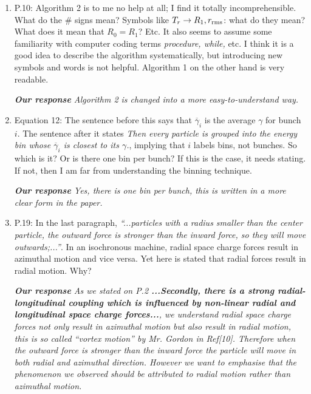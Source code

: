 \documentclass[10pt]{report}
\begin{document}
\begin{enumerate}
\item P.10: Algorithm 2 is to me no help at all; I find it totally
 incomprehensible. 
 What do the \# signs mean? Symbols like $T_r\rightarrow R_1,r_{\rm rms}$: what
 do they mean? What does it mean that $R_0=R_1$? Etc. It also seems to assume
 some familiarity with computer coding terms \textit{procedure, while,} etc. I
 think it is a good idea to describe the algorithm systematically, but
 introducing new symbols and words is not helpful. Algorithm 1 on the other hand
 is very readable.
 
 \vspace{+2mm}
 {\it {\bf Our response} Algorithm 2 is changed into a more easy-to-understand way.
 }
 \vspace{+2mm}

  \item Equation 12: The sentence before this says that $\overline{\gamma}_i$ is
 the 
 average $\gamma$ for bunch $i$. The sentence after it states \textit{Then every
 particle is grouped into the energy bin whose $\overline{\gamma}_i$ is closest
 to its $\gamma$.}, implying that $i$ labels bins, not bunches. So which is it?
 Or is there one bin per bunch? If this is the case, it needs stating. If not,
 then I am far from understanding the binning technique.

 
 \vspace{+2mm}
 {\it {\bf Our response}  Yes, there is one bin per bunch, this is written in a more clear form 
 in the paper. }
 \vspace{+2mm}

 \item P.19: In the last paragraph, \textit{``...particles with a radius smaller
 than the center particle, the outward force is stronger than the inward force,
 so they will move outwards;...''}. In an isochronous machine, radial space
 charge forces result in azimuthal motion and vice versa. Yet here is stated
 that radial forces result in radial motion. Why?
 
 \vspace{+2mm}
 {\it {\bf Our response} As we stated on P.2 {\bf ...Secondly, there is a strong radial-longitudinal coupling which is influenced by non-linear radial and
longitudinal space charge forces...}, we understand radial space charge forces not only result in azimuthal motion but also result in radial motion, 
this is so called  ``vortex motion'' by Mr. Gordon in Ref[10]. Therefore when the outward force is stronger than the inward force the particle will move 
in both radial and azimuthal direction. However we want to emphasise that the phenomenon we observed should be attributed to radial motion rather than azimuthal motion.   
 }
 \vspace{+2mm} 

 \end{enumerate}
\end{document}
